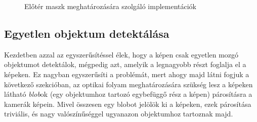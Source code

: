 \begin{figure}[tbh]
\centering


\caption{Előtér maszk meghatározására szolgáló implementációk \label{fig:cd:fg-mask-calc}}
\end{figure}

\subsection{Egyetlen objektum detektálása}

Kezdetben azzal az egyszerűsítéssel élek, hogy a képen csak egyetlen mozgó objektumot detektálok, mégpedig azt, amelyik a legnagyobb részt foglalja el a képeken. Ez nagyban egyszerűsíti a problémát, mert ahogy majd látni fogjuk a következő szekcióban, az optikai folyam meghatározására szükség lesz a képeken látható \textit{blob}ok (egy objektumhoz tartozó egybefüggő rész a képen) párosításra a kamerák képein. Mivel összesen egy blobot jelölök ki a képeken, ezek párosítása triviális, és nagy valószínűséggel ugyanazon objektumhoz tartoznak majd.

